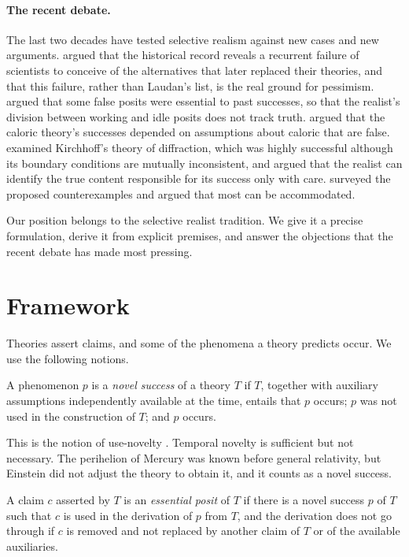 \documentclass{situationist-preprint}
\begin{document}
\paragraph{The recent debate.} The last two decades have tested selective realism against new cases and new arguments. \citet{Stanford2006} argued that the historical record reveals a recurrent failure of scientists to conceive of the alternatives that later replaced their theories, and that this failure, rather than Laudan's list, is the real ground for pessimism. \citet{Lyons2006} argued that some false posits were essential to past successes, so that the realist's division between working and idle posits does not track truth. \citet{Chang2003} argued that the caloric theory's successes depended on assumptions about caloric that are false. \citet{SaatsiVickers2011} examined Kirchhoff's theory of diffraction, which was highly successful although its boundary conditions are mutually inconsistent, and argued that the realist can identify the true content responsible for its success only with care. \citet{Vickers2013} surveyed the proposed counterexamples and argued that most can be accommodated.

Our position belongs to the selective realist tradition. We give it a precise formulation, derive it from explicit premises, and answer the objections that the recent debate has made most pressing.

\section{Framework}

Theories assert claims, and some of the phenomena a theory predicts occur. We use the following notions.

\begin{definition}\label{d:novel}
A phenomenon $p$ is a \emph{novel success} of a theory $T$ if $T$, together with auxiliary assumptions independently available at the time, entails that $p$ occurs; $p$ was not used in the construction of $T$; and $p$ occurs.
\end{definition}

This is the notion of use-novelty \citep{Worrall1989}. Temporal novelty is sufficient but not necessary. The perihelion of Mercury was known before general relativity, but Einstein did not adjust the theory to obtain it, and it counts as a novel success.

\begin{definition}\label{d:essential}
A claim $c$ asserted by $T$ is an \emph{essential posit} of $T$ if there is a novel success $p$ of $T$ such that $c$ is used in the derivation of $p$ from $T$, and the derivation does not go through if $c$ is removed and not replaced by another claim of $T$ or of the available auxiliaries.
\end{definition}
\end{document}
